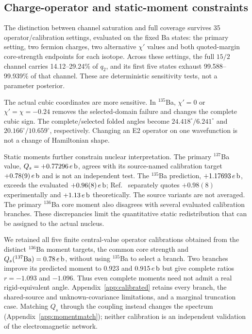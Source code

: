\subsection{Charge-operator and static-moment constraints}\label{sec:emlimits}

The distinction between channel saturation and full coverage survives
35 operator/calibration settings, evaluated on the fixed Ba states:
the primary setting, two fermion charges, two alternative $\chi'$ values
and both quoted-margin core-strength endpoints for each isotope.
Across these settings, the full $15/2$ channel carries 14.12--29.24\%
of $q_2$, and its first five states exhaust 99.588--99.939\% of that channel.
These are deterministic sensitivity tests, not a parameter posterior.

The actual cubic coordinates are more sensitive. In $^{135}$Ba,
$\chi'=0$ or $\chi'=\chi=-0.24$ removes the selected-domain failure and
changes the complete cubic sign. The complete/selected folded angles
become $24.418^\circ/6.241^\circ$ and
$20.166^\circ/10.659^\circ$, respectively. Changing an E2 operator on
one wavefunction is not a change of Hamiltonian shape.

Static moments further constrain nuclear interpretation.
The primary $^{137}$Ba value, $Q_s=+0.77296\,e\,{\rm b}$, agrees with
its source-named calibration target $+0.78(9)\,e\,{\rm b}$ and is not
an independent test. The $^{135}$Ba prediction,
$+1.17693\,e\,{\rm b}$, exceeds the evaluated $+0.96(8)\,e\,{\rm b}$;
Ref.~\cite{Nomura2017} separately quotes $+0.98(8)$ experimentally
and $+1.13\,e\,{\rm b}$ theoretically. The source variants are not averaged.
The primary $^{136}$Ba core moment also disagrees with several evaluated
calibration branches. These discrepancies limit the quantitative static
redistribution that can be assigned to the actual nucleus.

We retained all five finite central-value operator calibrations obtained
from the distinct $^{136}$Ba moment targets, the common core strength
and $Q_s(^{137}{\rm Ba})=0.78\,e\,{\rm b}$, without using $^{135}$Ba to
select a branch. Two branches improve its predicted moment to 0.923 and
$0.915\,e\,{\rm b}$ but give complete ratios $r=-1.093$ and $-1.096$.
Thus even complete moments need not admit a real rigid-equivalent angle.
Appendix~\ref{app:calibrated} retains every branch, the shared-source
and unknown-covariance limitations, and a marginal truncation case.
Matching $Q_s$ through the coupling instead changes the spectrum
(Appendix~\ref{app:momentmatch}); neither calibration is an independent
validation of the electromagnetic network.
